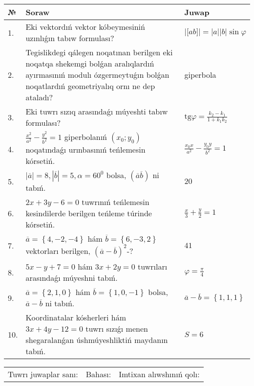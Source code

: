 \documentclass{article}
\begin{document}
\begin{tabular}{|m{0.7cm}|m{10cm}|m{4cm}|}
\hline
№ & Soraw & Juwap \\
\hline
1. & Eki vektordıń vektor kóbeymesiniń uzınlıǵın tabıw formulası? & $\left| \lbrack ab\rbrack \right|=|a||b|\sin\varphi$ \\
\hline
2. & Tegislikdegi qálegen noqatınan berilgen eki noqatqa shekemgi bolǵan aralıqlardıń ayırmasınıń modulı ózgermeytuǵın bolǵan noqatlardıń geometriyalıq ornı ne dep ataladı? & giperbola \\
\hline
3. & Eki tuwrı sızıq arasındaǵı múyeshti tabıw formulası? & $\text{tg}\varphi=\frac{k_2-k_1}{1+k_1k_2}$ \\
\hline
4. & $\frac{x^2}{a^2}-\frac{y^2}{b^2}=1$ giperbolanıń $(x_0;y_0)$ noqatındaǵı urınbasınıń teńlemesin kórsetiń. & $\frac{x_0x}{a^2}-\frac{y_0y}{b^2}=1$ \\
\hline
5. & $\left| \overline{a} \right|=8, \left| \overline{b} \right|=5, \alpha=60^{0}$ bolsa, $( \overline{a}\overline{b} )$ ni tabıń. & $20$ \\
\hline
6. & $2x+3y-6=0$ tuwrınıń teńlemesin kesindilerde berilgen teńleme túrinde kórsetiń. & $\frac{x}{3} + \frac{ y }{ 2 } =  1$ \\
\hline
7. & $\overline{a}=\left\{ 4,-2,-4 \right\}$ hám $\overline{b}=\left\{ 6,-3, 2 \right\}$ vektorları berilgen, $(\overline{a}-\overline{b}) ^{2}$-? & $41$ \\
\hline
8. & $5x-y+7=0$ hám $3x+2y=0$ tuwrıları arasındaǵı múyeshni tabıń. & $\varphi=\frac{\pi}{4}$ \\
\hline
9. & $\overline{a}=\left\{ 2, 1, 0 \right\}$ hám $\overline{b}=\left\{ 1, 0,-1 \right\}$ bolsa, $\overline{a}-\overline{b}$ ni tabıń. & $\overline{a} -\overline{b} = \left\{ 1,1,1 \right\}$ \\
\hline
10. & Koordinatalar kósherleri hám $ 3x+4y-12=0 $ tuwrı sızıǵı menen shegaralanǵan úshmúyeshliktiń maydanın tabıń. & $ S=6 $ \\
\hline
\end{tabular}

\vspace{1cm}

\begin{tabular}{lll}
Tuwrı juwaplar sanı: \underline{\hspace{1.5cm}} & 
Bahası: \underline{\hspace{1.5cm}} & 
Imtixan alıwshınıń qolı: \underline{\hspace{2cm}} \\
\end{tabular}
\end{document}
